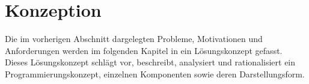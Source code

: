 \chapter{Konzeption}
Die im vorherigen Abschnitt dargelegten Probleme, Motivationen und Anforderungen werden im folgenden Kapitel in ein Lösungskonzept gefasst. Dieses Lösungskonzept schlägt vor, beschreibt, analysiert und rationalisiert ein Programmierungskonzept, einzelnen Komponenten sowie deren Darstellungsform.





